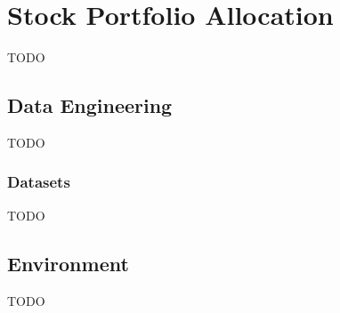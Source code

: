 \documentclass[../chapters]{subfiles}
\begin{document}
    \chapter{Stock Portfolio Allocation}\label{sec:implementation}
    TODO


    \section{Data Engineering}\label{ch:data-engineering}
    TODO

    \subsection{Datasets}\label{sec:datasets}
    TODO



    \section{Environment}\label{sec:environment}
    TODO
\end{document}
